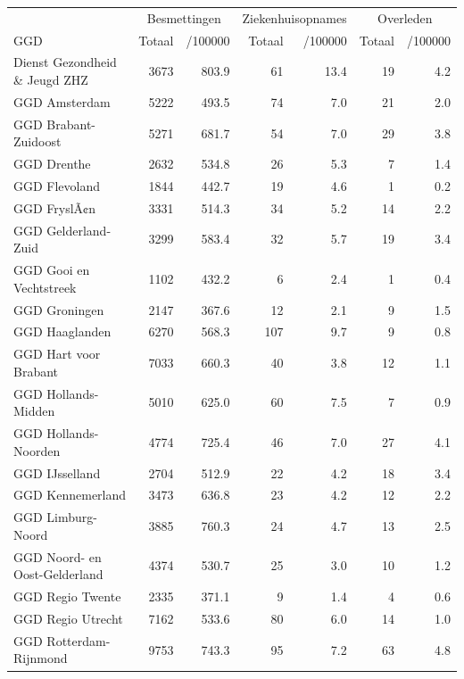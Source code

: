 \documentclass[
  english,
  man,floatsintext]{apa6}
\begin{document}
\begin{table}
\centering\begingroup\fontsize{10}{12}\selectfont

\begin{threeparttable}
\begin{tabular}{lrrrrrr}
\toprule
\multicolumn{1}{c}{ } & \multicolumn{2}{c}{Besmettingen} & \multicolumn{2}{c}{Ziekenhuisopnames} & \multicolumn{2}{c}{Overleden} \\
\cmidrule(l{3pt}r{3pt}){2-3} \cmidrule(l{3pt}r{3pt}){4-5} \cmidrule(l{3pt}r{3pt}){6-7}
GGD & Totaal & /100000 & Totaal & /100000 & Totaal & /100000\\
\midrule
Dienst Gezondheid \& Jeugd ZHZ & 3673 & 803.9 & 61 & 13.4 & 19 & 4.2\\
GGD Amsterdam & 5222 & 493.5 & 74 & 7.0 & 21 & 2.0\\
GGD Brabant-Zuidoost & 5271 & 681.7 & 54 & 7.0 & 29 & 3.8\\
GGD Drenthe & 2632 & 534.8 & 26 & 5.3 & 7 & 1.4\\
GGD Flevoland & 1844 & 442.7 & 19 & 4.6 & 1 & 0.2\\
GGD FryslÃ¢n & 3331 & 514.3 & 34 & 5.2 & 14 & 2.2\\
GGD Gelderland-Zuid & 3299 & 583.4 & 32 & 5.7 & 19 & 3.4\\
GGD Gooi en Vechtstreek & 1102 & 432.2 & 6 & 2.4 & 1 & 0.4\\
GGD Groningen & 2147 & 367.6 & 12 & 2.1 & 9 & 1.5\\
GGD Haaglanden & 6270 & 568.3 & 107 & 9.7 & 9 & 0.8\\
GGD Hart voor Brabant & 7033 & 660.3 & 40 & 3.8 & 12 & 1.1\\
GGD Hollands-Midden & 5010 & 625.0 & 60 & 7.5 & 7 & 0.9\\
GGD Hollands-Noorden & 4774 & 725.4 & 46 & 7.0 & 27 & 4.1\\
GGD IJsselland & 2704 & 512.9 & 22 & 4.2 & 18 & 3.4\\
GGD Kennemerland & 3473 & 636.8 & 23 & 4.2 & 12 & 2.2\\
GGD Limburg-Noord & 3885 & 760.3 & 24 & 4.7 & 13 & 2.5\\
GGD Noord- en Oost-Gelderland & 4374 & 530.7 & 25 & 3.0 & 10 & 1.2\\
GGD Regio Twente & 2335 & 371.1 & 9 & 1.4 & 4 & 0.6\\
GGD Regio Utrecht & 7162 & 533.6 & 80 & 6.0 & 14 & 1.0\\
GGD Rotterdam-Rijnmond & 9753 & 743.3 & 95 & 7.2 & 63 & 4.8\\

\end{tabular}
\end{threeparttable}
\end{table}
\end{document}
